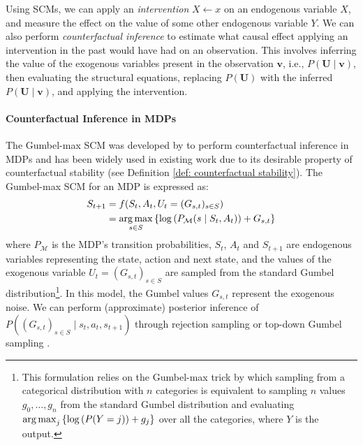 Using SCMs, we can apply an \textit{intervention} $X \leftarrow x$ on an endogenous variable $X$, and measure the effect on the value of some other endogenous variable $Y$. We can also perform \textit{counterfactual inference} to estimate what causal effect applying an intervention in the past would have had on an observation. This involves inferring the value of the exogenous variables present in the observation $\mathbf{v}$, i.e., $P(\mathbf{U} \mid \mathbf{v})$, then evaluating the structural equations, replacing $P(\mathbf{U})$ with the inferred $P(\mathbf{U} \mid \mathbf{v})$, and applying the intervention. 

\paragraph{Counterfactual Inference in MDPs}
The Gumbel-max SCM was developed by \citet{oberst2019counterfactual} to perform counterfactual inference in MDPs and has been widely used in existing work \citep{lorberbom2021learning, benz2022counterfactual, noorbakhsh2022counterfactual, killian2022counterfactually, zhu2020counterfactual, kazemi2022causal, kazemi2024counterfactual} due to its desirable property of counterfactual stability (see Definition \ref{def: counterfactual stability}). The Gumbel-max SCM for an MDP is expressed as:
\begin{equation}\label{eq:gumbel-max-scm}  \begin{aligned}
    S_{t+1} &= f(S_{t},A_{t}, U_{t}=(G_{s,t})_{s\in S}) 
    \\ &= \operatorname*{arg\,max}_{s\in S}\left\{\log\left(P_{\mathcal{M}}(s \mid S_t, A_t)\right) +G_{s,t}\right\}
\end{aligned}  
\end{equation}
where $P_{\mathcal{M}}$ is the MDP's transition probabilities, $S_t$, $A_t$ and $S_{t+1}$ are endogenous variables representing the state, action and next state, and the values of the exogenous variable $U_{t}=(G_{s,t})_{s\in S}$ are sampled from the standard Gumbel distribution\footnote{This formulation relies on the Gumbel-max trick \citep{maddison2014sampling} by which sampling from a categorical distribution with $n$ categories is equivalent to sampling $n$ values $g_0,\dots,g_n$ from the standard Gumbel distribution and evaluating $\operatorname*{arg\,max}_{j}\left\{\log\left(P(Y=j)\right)+ g_j\right\}$ over all the categories, where $Y$ is the output.}. In this model, the Gumbel values $G_{s,t}$ represent the exogenous noise. We can perform (approximate) posterior inference of $P((G_{s,t})_{s\in S} \mid s_t, a_t, s_{t+1})$ through rejection sampling \citep{oberst2019counterfactual} or top-down Gumbel sampling \citep{maddison2014sampling}.
%

